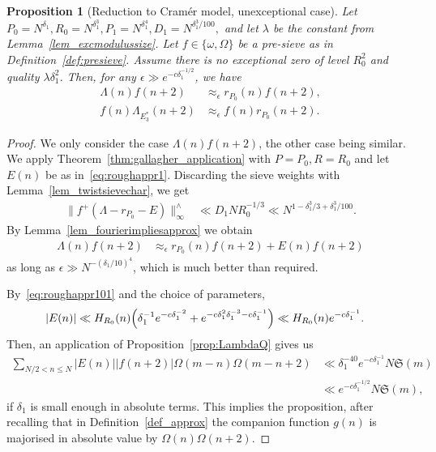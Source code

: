\documentclass[12pt]{amsart}
\newtheorem{prop}[theorem]{Proposition}
\theoremstyle{definition}
\theoremstyle{remark}
\numberwithin{equation}{section}
\newcommand{\1}{\mathbf{1}}
\begin{document}
\begin{prop}[Reduction to Cram\'er model, unexceptional case]\label{prop_reducetorough}  Let $P_0=N^{\delta_1},R_0=N^{\delta_1^3},P_1=N^{\delta_1^4},D_1=N^{\delta_1^3/100},$  and let $\lambda$ be the constant from Lemma~\ref{lem_excmodulussize}. Let $f\in\{\omega,\Omega\}$ be a pre-sieve as in Definition~\ref{def:presieve}.
	Assume there is no exceptional zero of level $R_0^2$ and quality $\lambda \delta_1^2$. Then, for any $\epsilon \gg e^{-c \delta_1^{-1/2}}$, we have
		\begin{align*}
			\Lambda(n)f(n+2)&\approx_{\epsilon} r_{P_0}(n) f(n+2),\\
			f(n)\Lambda_{E_3^*}(n+2)&\approx_{\epsilon} f(n)r_{P_0}(n+2).
		\end{align*}
\end{prop}

\begin{proof}
    We only consider the case $\Lambda(n)f(n+2)$, the other case being similar. We apply Theorem~\ref{thm:gallagher_application} with $P=P_0, R=R_0$ and let $E(n)$ be as in~\eqref{eq:roughappr1}. Discarding the sieve weights with Lemma~\ref{lem_twistsievechar}, we get
    \begin{align*}
        \|f^+(\Lambda - r_{P_0}-E)\|^{\wedge}_\infty &\ll D_1  N R_0^{-1/3}\ll N^{1-\delta_1^3/3+\delta_1^3/100}.
    \end{align*}
    By Lemma~\ref{lem_fourierimpliesapprox}  we obtain
    \begin{align*}
        \Lambda(n)f(n+2)&\approx_{\epsilon} r_{P_0}(n) f(n+2)+E(n)f(n+2)
    \end{align*}
    as long as $\epsilon\gg N^{-(\delta_1/10)^{4}}$, which is much better than required. 

    By~\eqref{eq:roughappr101} and the choice of parameters, 
    \begin{align*}
            |E(n)|&\ll H_{R_0}(n) \Bigl(\delta_1^{-1}e^{-c \delta_1^{-2}}+e^{-c \delta_1^2 \delta_1^{-3}-c \delta_1^{-1}}\Bigr)\ll H_{R_0}(n) e^{-c\delta_1^{-1}}.
	   \end{align*}
    Then, an application of Proposition~\ref{prop:LambdaQ} gives us
    \begin{align*}
        \sum_{N/2<n\leq N} |E(n)| |f(n+2)| \Omega(m-n)\Omega(m-n+2)&\ll \delta_1^{-40}e^{-c\delta_1^{-1}} N \mathfrak{S}(m)\\
          &\ll e^{-c \delta_1^{-1/2}}N\mathfrak{S}(m),
    \end{align*}
    if $\delta_1$ is small enough in absolute terms. This implies the proposition, after recalling that in Definition~\ref{def_approx} the companion function $g(n)$ is majorised in absolute value by $\Omega(n)\Omega(n+2)$.
\end{proof}
\end{document}
